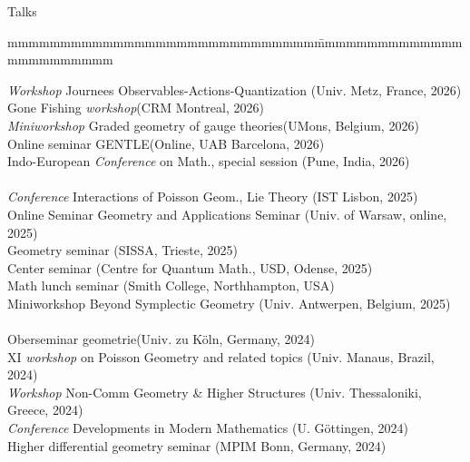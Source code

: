 \documentclass[12p]{resume}
\begin{document}

 
\begin{category}{Talks}
\citemnobullet
\begin{tabbing}
mmmmmmmmmmmmmmmmmmmmmmmmmmmmm\= mmmmmmmmmmmmmmmmmmmmmmmm \kill

\emph{Workshop} Journees Observables-Actions-Quantization \>(Univ. Metz, France, 2026)\\%
Gone Fishing \emph{workshop}\>(CRM Montreal, 2026)\\%
\emph{Miniworkshop} Graded geometry of gauge theories\>(UMons, Belgium, 2026)\\%
Online seminar GENTLE\>(Online, UAB Barcelona, 2026)\\ %
Indo-European \emph{Conference} on  Math., special session \>(Pune, India, 2026)\\ 
\>\\%


\emph{Conference} Interactions of Poisson Geom., Lie Theory \> (IST Lisbon, 2025)\\%
Online Seminar Geometry and Applications Seminar\> (Univ. of Warsaw, online, 2025)\\%
Geometry seminar \> (SISSA, Trieste, 2025)\\%
Center seminar \> (Centre for Quantum Math., USD, Odense, 2025)\\%
Math lunch seminar\> (Smith College, Northhampton, USA)\\%
Miniworkshop Beyond Symplectic Geometry \>(Univ. Antwerpen, Belgium, 2025)\\%
\>\\

Oberseminar geometrie\>(Univ. zu K\"oln, Germany, 2024)\\%
XI \emph{workshop} on Poisson Geometry and related topics\>
(Univ. Manaus, Brazil, 2024)\\%
\emph{Workshop} Non-Comm Geometry \& Higher Structures\>
(Univ. Thessaloniki, Greece, 2024)\\%
\emph{Conference} Developments in Modern Mathematics\> (U.  G\"ottingen, 2024)\\%
 Higher differential geometry seminar \>(MPIM Bonn, Germany, 2024)\\%
\>\\



\end{tabbing}
\end{category}
\end{document}
